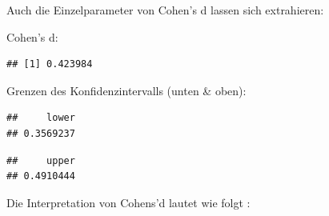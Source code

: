 \documentclass[
]{book}
\newenvironment{Shaded}{\begin{snugshade}}{\end{snugshade}}
\newcommand{\AttributeTok}[1]{\textcolor[rgb]{0.13,0.29,0.53}{#1}}
\newcommand{\DecValTok}[1]{\textcolor[rgb]{0.00,0.00,0.81}{#1}}
\newcommand{\FunctionTok}[1]{\textcolor[rgb]{0.13,0.29,0.53}{\textbf{#1}}}
\newcommand{\NormalTok}[1]{#1}
\newcommand{\SpecialCharTok}[1]{\textcolor[rgb]{0.81,0.36,0.00}{\textbf{#1}}}
\begin{document}
Auch die Einzelparameter von Cohen's d lassen sich extrahieren:

Cohen's d:

\begin{Shaded}
\end{Shaded}

\begin{verbatim}
## [1] 0.423984
\end{verbatim}

Grenzen des Konfidenzintervalls (unten \& oben):

\begin{Shaded}
\end{Shaded}

\begin{verbatim}
##     lower 
## 0.3569237
\end{verbatim}

\begin{Shaded}
\end{Shaded}

\begin{verbatim}
##     upper 
## 0.4910444
\end{verbatim}

Die Interpretation von Cohens'd lautet wie folgt \citet{cohen1992quantitative}:
\end{document}
